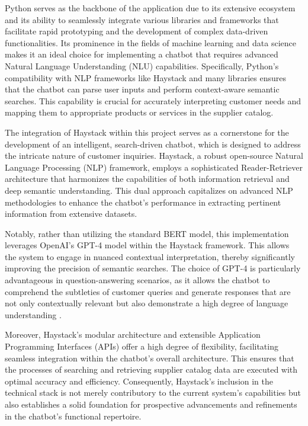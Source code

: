 
Python serves as the backbone of the application due to its extensive ecosystem and its ability to seamlessly integrate
various libraries and frameworks that facilitate rapid prototyping and the development of complex data-driven
functionalities.\autocite[cf.][p. 12]{shrivastavaDesignImplementationChatbot}
\autocite[cf.][pp. 240-241]{christensenPythonPipelineRapid2022} Its prominence in the fields of machine
learning and data science makes it an ideal choice for implementing a chatbot that requires advanced Natural Language
Understanding (\ac{NLU}) capabilities.\autocite[cf.][p. 1]{lortiePythonModernData2022}\autocite[cf.][p. 85]{joshiOverviewPythonLibraries}
Specifically, Python's compatibility with NLP frameworks like Haystack and many libraries ensures that
the chatbot can parse user inputs and perform context-aware semantic searches.\autocite[cf.][p. 21]{fareezPOPULARPYTHONLIBRARIES2020}
This capability is crucial for accurately interpreting customer needs and mapping them to appropriate products or services in the supplier catalog.

The integration of Haystack within this project serves as a cornerstone for the development of an intelligent,
search-driven chatbot, which is designed to address the intricate nature of customer inquiries. Haystack, a robust
open-source Natural Language Processing (NLP) framework, employs a sophisticated Reader-Retriever architecture that
harmonizes the capabilities of both information retrieval and deep semantic understanding. This dual approach
capitalizes on advanced NLP methodologies to enhance the chatbot’s performance in extracting pertinent information from
extensive datasets\autocite[cf.][p. 236]{krishnamoorthyEvolutionReadingComprehension2021}.

Notably, rather than utilizing the standard BERT model, this implementation leverages OpenAI’s GPT-4 model within the
Haystack framework. This allows the system to engage in nuanced contextual interpretation, thereby significantly
improving the precision of semantic searches. The choice of GPT-4 is particularly advantageous in question-answering
scenarios, as it allows the chatbot to comprehend the subtleties of customer queries and generate responses that are not
only contextually relevant but also demonstrate a high degree of language understanding
\autocite[cf.][pp. 943-944]{syedQuestionAnsweringChatbot2021}.

Moreover, Haystack’s modular architecture and extensible Application Programming Interfaces (\ac{API}s) offer a high
degree of flexibility, facilitating seamless integration within the chatbot’s overall architecture. This ensures that
the processes of searching and retrieving supplier catalog data are executed with optimal accuracy and efficiency.
Consequently, Haystack’s inclusion in the technical stack is not merely contributory to the current system’s
capabilities but also establishes a solid foundation for prospective advancements and refinements in the chatbot’s
functional repertoire.

